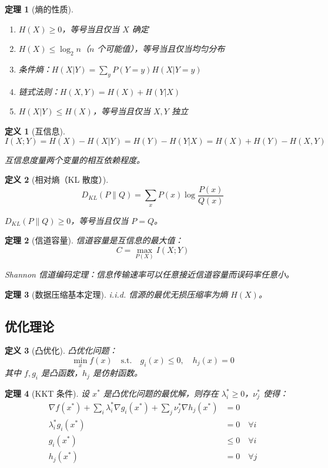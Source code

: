 \documentclass[12pt]{article}
\newtheorem{theorem}{定理}[section]
\newtheorem{definition}{定义}[section]
\begin{document}
\begin{theorem}[熵的性质]
\begin{enumerate}
\item $H(X) \geq 0$，等号当且仅当 $X$ 确定
\item $H(X) \leq \log_2 n$（$n$ 个可能值），等号当且仅当均匀分布
\item 条件熵：$H(X|Y) = \sum_y P(Y = y) H(X|Y = y)$
\item 链式法则：$H(X, Y) = H(X) + H(Y|X)$
\item $H(X|Y) \leq H(X)$，等号当且仅当 $X, Y$ 独立
\end{enumerate}
\end{theorem}

\begin{definition}[互信息]
$$I(X; Y) = H(X) - H(X|Y) = H(Y) - H(Y|X) = H(X) + H(Y) - H(X, Y)$$

互信息度量两个变量的相互依赖程度。
\end{definition}

\begin{definition}[相对熵（KL 散度）]
$$D_{KL}(P \| Q) = \sum_x P(x) \log \frac{P(x)}{Q(x)}$$

$D_{KL}(P \| Q) \geq 0$，等号当且仅当 $P = Q$。
\end{definition}

\begin{theorem}[信道容量]
信道容量是互信息的最大值：
$$C = \max_{P(X)} I(X; Y)$$

Shannon 信道编码定理：信息传输速率可以任意接近信道容量而误码率任意小。
\end{theorem}

\begin{theorem}[数据压缩基本定理]
i.i.d. 信源的最优无损压缩率为熵 $H(X)$。
\end{theorem}

\subsection{优化理论}

\begin{definition}[凸优化]
凸优化问题：
$$\min_{x} f(x) \quad \text{s.t.} \quad g_i(x) \leq 0, \quad h_j(x) = 0$$
其中 $f, g_i$ 是凸函数，$h_j$ 是仿射函数。
\end{definition}

\begin{theorem}[KKT 条件]
设 $x^*$ 是凸优化问题的最优解，则存在 $\lambda_i^* \geq 0$，$\nu_j^*$ 使得：
\begin{align}
\nabla f(x^*) + \sum_i \lambda_i^* \nabla g_i(x^*) + \sum_j \nu_j^* \nabla h_j(x^*) &= 0 \\
\lambda_i^* g_i(x^*) &= 0 \quad \forall i \\
g_i(x^*) &\leq 0 \quad \forall i \\
h_j(x^*) &= 0 \quad \forall j
\end{align}
\end{theorem}
\end{document}
